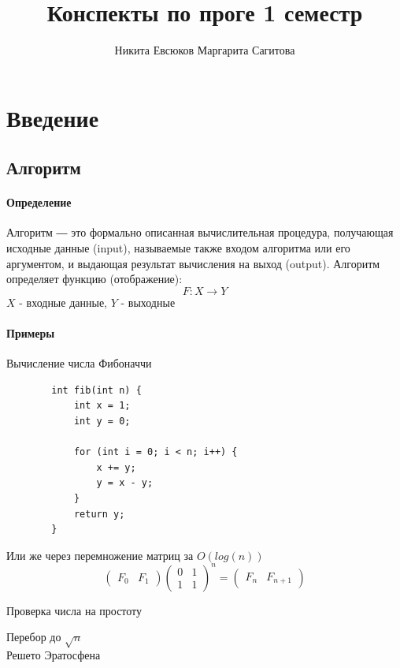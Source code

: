 \documentclass[a4paper,10pt]{article}
\title{Конспекты по проге 1 семестр}
\author{{Никита Евсюков} {Маргарита Сагитова}}
\date{}
\begin{document}
	\maketitle
	\tableofcontents
	\newpage
	
	\section{Введение}

	\subsection{Алгоритм}
	\paragraph{Определение}
		Алгоритм ― это формально описанная вычислительная процедура, получающая исходные данные (input), называемые также входом алгоритма или его аргументом, и выдающая результат вычисления на выход (output).
		Алгоритм определяет функцию (отображение):
		\begin{equation}
			F \colon X \to Y
		\end{equation}
		$X$ - входные данные, $Y$ - выходные
	\paragraph{Примеры}
	\begin{center}
	Вычисление числа Фибоначчи
	\end{center}
	\begin{lstlisting}
		int fib(int n) {
			int x = 1;
			int y = 0;
			
			for (int i = 0; i < n; i++) {
				x += y;
				y = x - y;
			}
			return y;
		}
	\end{lstlisting}
	Или же через перемножение матриц за $O(log(n))$
	\[
	\begin{pmatrix}
		F_{0} & F_{1}
	\end{pmatrix}
	\begin{pmatrix}
		0 & 1 \\
		1 & 1
	\end{pmatrix} ^ {\!\!n}
	=
	\begin{pmatrix}
		F_{n} & F_{n+1}
	\end{pmatrix}
	\]

	\begin{center}
		Проверка числа на простоту
	\end{center}
	Перебор до $\sqrt{n}$ \\
	Решето Эратосфена
	
\end{document}
